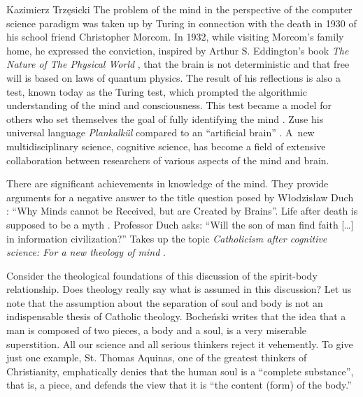 \begin{artengenv}{Kazimierz Trzęsicki}
The problem of the mind in the perspective of the computer science paradigm was taken up by Turing in connection with the death in 1930 of his school friend Christopher Morcom. In 1932, while visiting Morcom's family home, he expressed the conviction, inspired by Arthur S. Eddington's book \emph{The Nature of The Physical World} \parencite*{Eddington2014}, that the brain is not deterministic and that free will is based on laws of quantum physics. The result of his reflections is also a test, known today as the Turing test, which prompted the algorithmic understanding of the mind and consciousness. This test became a model for others who set themselves the goal of fully identifying the mind \parencite{Krajewski2012}. Zuse his universal language \textit{Plankalk{\"u}l} compared to an ``artificial brain'' \parencite[p.62]{German2012}. A~new multidisciplinary science, cognitive science, has become a field of extensive collaboration between researchers of various aspects of the mind and brain.


There are significant achievements in knowledge of the mind. They provide arguments for a negative answer to the title question posed by Włodzisław Duch \parencite*{duch_why_2017}: %
``Why Minds cannot be Received, but are Created by Brains''. Life after death is supposed to be a  myth \parencite{MartinAugustine2015}. Professor Duch asks: ``Will the son of man find faith [\ldots] in information civilization?'' Takes up the topic \emph{Catholicism after cognitive science: For a new theology of mind} \parencites{duch_katolicyzm_2015}[see also][]{slomka_neuronauki_2012}.

Consider the theological foundations of this discussion of the spirit-body relationship. Does theology really say what is assumed in this discussion? Let us note that the assumption about the separation of soul and body is not an indispensable thesis of Catholic theology. Bocheński \parencite*{Bochenski1994} writes   that the idea that a man is composed of two pieces, a body and a soul, is a very miserable superstition.   All our science and all serious thinkers reject it vehemently. To give just one example, St. Thomas Aquinas, one of the greatest thinkers of Christianity, emphatically denies that the human soul is a ``complete substance'', that is, a piece, and defends the view that it is ``the content (form) of the body.''


\end{artengenv}
